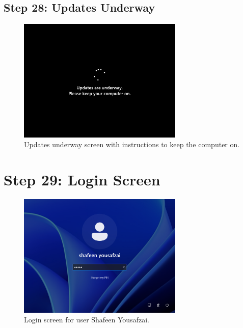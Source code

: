 \documentclass{article}
\begin{document}
\subsection{Step 28: Updates Underway}
\begin{figure}[H]
    \centering
    \includegraphics[width=0.7\textwidth]{2024-09-17_15-58-42.png}
    \caption{Updates underway screen with instructions to keep the computer on.}
    \label{fig:updates_underway}
\end{figure}

\section{Step 29: Login Screen}
\begin{figure}[H]
    \centering
    \includegraphics[width=0.7\textwidth]{2024-09-17_16-01-53.png}
    \caption{Login screen for user Shafeen Yousafzai.}
    \label{fig:login_screen}
\end{figure}
\end{document}
